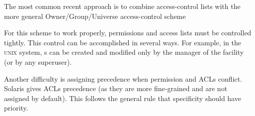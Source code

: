 The most common recent approach is to combine access-control lists with the more general Owner/Group/Universe access-control scheme

For this scheme to work properly, permissions and access lists must be controlled tightly.
This control can be accomplished in several ways.
For example, in the \textsc{unix} system, s can be created and modified only by the manager of the facility (or by any superuser).

Another difficulty is assigning precedence when permission and ACLs conflict.
Solaris gives ACLs precedence (as they are more fine-grained and are not assigned by default).
This follows the general rule that specificity should have priority.


